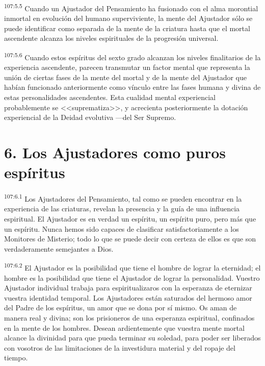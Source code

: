 \documentclass[twoside, 11pt]{book}
\begin{document}
\par
\textsuperscript{107:5.5} Cuando un Ajustador del Pensamiento ha fusionado con el alma morontial inmortal en evolución del humano superviviente, la mente del Ajustador sólo se puede identificar como separada de la mente de la criatura hasta que el mortal ascendente alcanza los niveles espirituales de la progresión universal.

\par
\textsuperscript{107:5.6} Cuando estos espíritus del sexto grado alcanzan los niveles finalitarios de la experiencia ascendente, parecen transmutar un factor mental que representa la unión de ciertas fases de la mente del mortal y de la mente del Ajustador que habían funcionado anteriormente como vínculo entre las fases humana y divina de estas personalidades ascendentes. Esta cualidad mental experiencial probablemente se <<suprematiza>>, y acrecienta posteriormente la dotación experiencial de la Deidad evolutiva ---del Ser Supremo.

\section*{6. Los Ajustadores como puros espíritus}
\par
\textsuperscript{107:6.1} Los Ajustadores del Pensamiento, tal como se pueden encontrar en la experiencia de las criaturas, revelan la presencia y la guía de una influencia espiritual. El Ajustador es en verdad un espíritu, un espíritu puro, pero más que un espíritu. Nunca hemos sido capaces de clasificar satisfactoriamente a los Monitores de Misterio; todo lo que se puede decir con certeza de ellos es que son verdaderamente semejantes a Dios.

\par
\textsuperscript{107:6.2} El Ajustador es la posibilidad que tiene el hombre de lograr la eternidad; el hombre es la posibilidad que tiene el Ajustador de lograr la personalidad. Vuestro Ajustador individual trabaja para espiritualizaros con la esperanza de eternizar vuestra identidad temporal. Los Ajustadores están saturados del hermoso amor del Padre de los espíritus, un amor que se dona por sí mismo. Os aman de manera real y divina; son los prisioneros de una esperanza espiritual, confinados en la mente de los hombres. Desean ardientemente que vuestra mente mortal alcance la divinidad para que pueda terminar su soledad, para poder ser liberados con vosotros de las limitaciones de la investidura material y del ropaje del tiempo.
\end{document}
